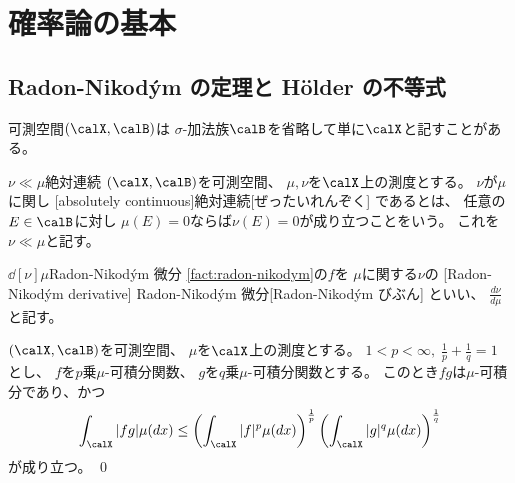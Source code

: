 \documentclass[report]{jlreq}
\begin{document}
%
\chapter{確率論の基本}

%
\section{Radon-Nikod\'ym の定理と H\"older の不等式}

可測空間$(\calX, \calB)$は
$\sigma$-加法族$\calB$を省略して単に$\calX$と記すことがある。

\begin{definition}[絶対連続]
        {$\nu \ll \mu$}{絶対連続}
    $(\calX, \calB)$を可測空間、
    $\mu, \nu$を$\calX$上の測度とする。
    $\nu$が$\mu$に関し
    [absolutely continuous]{絶対連続}[ぜったいれんぞく]
    であるとは、
    任意の$E \in \calB$に対し
    $\mu(E) = 0$ならば$\nu(E) = 0$が成り立つことをいう。
    これを
    $\nu \ll \mu$と記す。
\end{definition}


\begin{definition}
        {$\dd[\nu]{\mu}$}{Radon-Nikod\'ym 微分}
    \cref{fact:radon-nikodym}の$f$を
    $\mu$に関する$\nu$の
    [Radon-Nikod\'ym derivative]
        {Radon-Nikod\'ym 微分}[Radon-Nikod\'ym びぶん]
    といい、
    $\frac{d\nu}{d\mu}$と記す。
\end{definition}

\begin{fact}
    $(\calX, \calB)$を可測空間、
    $\mu$を$\calX$上の測度とする。
    $1 < p < \infty, \;
        \frac{1}{p} + \frac{1}{q} = 1$
    とし、
    $f$を$p$乗$\mu$-可積分関数、
    $g$を$q$乗$\mu$-可積分関数とする。
    このとき$fg$は$\mu$-可積分であり、かつ
    \begin{equation}
        \int_\calX |fg| \mu(dx)
            \le \myparen{
                \int_\calX |f|^{p} \mu(dx)
            }^{\frac{1}{p}}
            \myparen{
                \int_\calX |g|^{q} \mu(dx)
            }^{\frac{1}{q}}
    \end{equation}
    が成り立つ。
    \qed
\end{fact}
\end{document}
